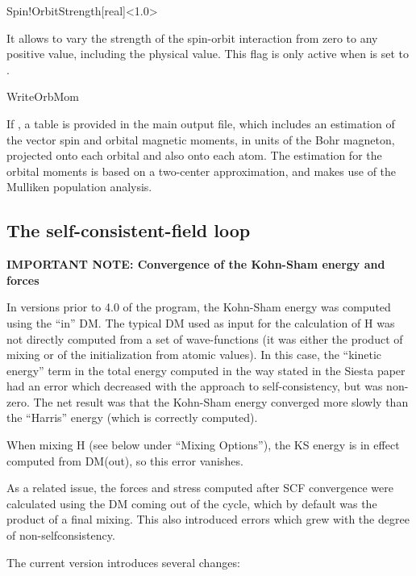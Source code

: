 \begin{fdfentry}{Spin!OrbitStrength}[real]<1.0>

  It allows to vary the strength of the spin-orbit interaction from
  zero to any positive value, including the physical value. This flag
  is only active when  is set to .

\end{fdfentry}

\begin{fdflogicalF}{WriteOrbMom}

  If \fdftrue, a table is provided in the main output file, which
  includes an estimation of the vector spin and orbital magnetic
  moments, in units of the Bohr magneton, projected onto each orbital
  and also onto each atom. The estimation for the orbital moments is
  based on a two-center approximation, and makes use of the Mulliken
  population analysis.

\end{fdflogicalF}


\subsection{The self-consistent-field loop}

\textbf{IMPORTANT NOTE: Convergence of the Kohn-Sham energy and forces}

In versions prior to 4.0 of the program, the Kohn-Sham energy was computed
using the ``in'' DM. The typical DM used as input for the calculation
of H was not directly computed from a set of wave-functions (it was
either the product of mixing or of the initialization from atomic
values). In this case, the ``kinetic energy'' term in the total energy
computed in the way stated in the Siesta paper had an error which
decreased with the approach to self-consistency, but was non-zero. The
net result was that the Kohn-Sham energy converged more slowly than
the ``Harris'' energy (which is correctly computed).

When mixing H (see below under ``Mixing Options''), the KS energy is
in effect computed from DM(out), so this error vanishes.

As a related issue, the forces and stress computed after SCF
convergence were calculated using the DM coming out of the cycle,
which by default was the product of a final mixing. This also
introduced errors which grew with the degree of non-selfconsistency.

The current version introduces several changes:

